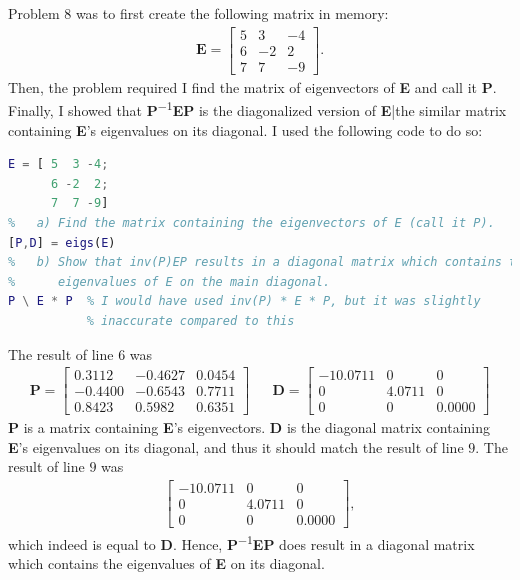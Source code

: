 \documentclass{article}
\begin{document}
Problem 8 was to first create the following matrix in memory:
\begin{align*}
    \textbf{E} = \begin{bmatrix}
    5 & 3 & -4\\
    6 & -2 & 2\\
    7 & 7 & -9
    \end{bmatrix}.
\end{align*}
Then, the problem required I find the matrix of eigenvectors of \textbf{E} and call it \textbf{P}.  Finally, I showed that \textbf{P\textsuperscript{$-1$}EP} is the diagonalized version of \textbf{E}|the similar matrix containing \textbf{E}'s eigenvalues on its diagonal.  I used the following code to do so:

\begin{lstlisting}[language=Matlab]
% Create the matrix E.
E = [ 5  3 -4;
      6 -2  2;
      7  7 -9]
%   a) Find the matrix containing the eigenvectors of E (call it P).
[P,D] = eigs(E)
%   b) Show that inv(P)EP results in a diagonal matrix which contains the 
%      eigenvalues of E on the main diagonal.
P \ E * P  % I would have used inv(P) * E * P, but it was slightly 
           % inaccurate compared to this
\end{lstlisting}

The result of line $6$ was
\begin{align*}
    \textbf{P} = \begin{bmatrix}
    0.3112 & -0.4627 & 0.0454\\
    -0.4400 & -0.6543 & 0.7711\\
    0.8423 & 0.5982 & 0.6351
    \end{bmatrix} && \textbf{D} = \begin{bmatrix}
    -10.0711 & 0 & 0\\
    0 & 4.0711 & 0\\
    0 & 0 & 0.0000
    \end{bmatrix}
\end{align*}
\textbf{P} is a matrix containing \textbf{E}'s eigenvectors.  \textbf{D} is the diagonal matrix containing \textbf{E}'s eigenvalues on its diagonal, and thus it should match the result of line $9$.  The result of line $9$ was
\begin{align*}
    \begin{bmatrix}
    -10.0711 & 0 & 0\\
    0 & 4.0711 & 0\\
    0 & 0 & 0.0000
    \end{bmatrix},
\end{align*}
which indeed is equal to \textbf{D}.  Hence, \textbf{P\textsuperscript{$-1$}EP} does result in a diagonal matrix which contains the eigenvalues of \textbf{E} on its diagonal.
\end{document}
